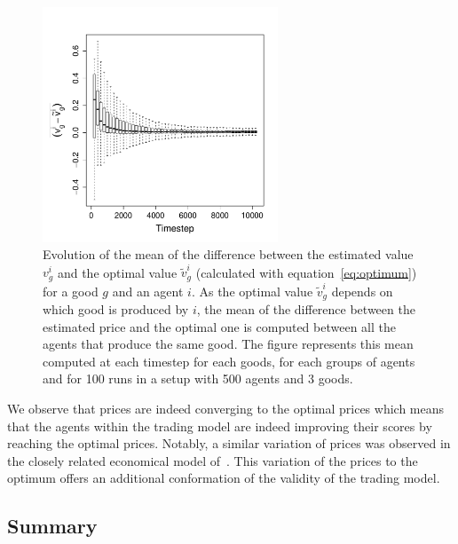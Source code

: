 \documentclass[a4paper]{article}
\begin{document}
\begin{figure}[!h]
	\begin{center}
		\includegraphics[width=7cm]{img/ClearingPriceDistanceEvolutionForTrade-G3N500.pdf}
	\end{center}
	\caption{Evolution of the mean of the difference between the estimated value $v^i_g$ and the optimal value $\tilde{v}^i_g$ (calculated with equation~\ref{eq:optimum}) for a good $g$ and an agent $i$. As the optimal value $\tilde{v}^i_g$ depends on which good is produced by $i$, the mean of the difference between the estimated price and the optimal one is computed between all the agents that produce the same good. The figure represents this mean computed at each timestep for each goods, for each groups of agents and for 100 runs in a setup with 500 agents and 3 goods. }
	\label{fig:ratioEvol}
\end{figure}

We observe that prices are indeed converging to the optimal prices which means that the agents within the trading model are indeed improving their scores by reaching the optimal prices. Notably, a similar variation of prices was observed in the closely related economical model of~\cite{gintis_emergence_2006}. This variation of the prices to the optimum offers an additional conformation of the validity of the trading model. 

\subsection{Summary}
\end{document}
